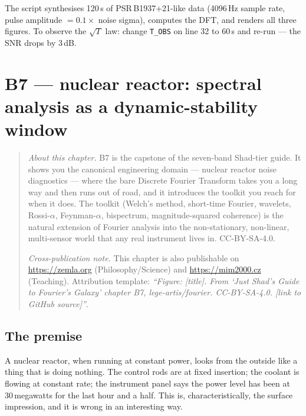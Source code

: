 \documentclass[11pt,a4paper,openany]{book}
\begin{document}
The script synthesises 120\,s of PSR\,B1937+21-like data (4096\,Hz sample
rate, pulse amplitude $= 0.1 \times$ noise sigma), computes the DFT, and
renders all three figures. To observe the $\sqrt{T}$ law: change
\texttt{T\_OBS} on line 32 to 60\,s and re-run --- the SNR drops by 3\,dB.

\chapter{B7 --- nuclear reactor: spectral analysis as a dynamic-stability window}
\label{ch:b7}

\begin{quote}
\textit{About this chapter.} B7 is the capstone of the seven-band Shad-tier
guide. It shows you the canonical engineering domain --- nuclear reactor noise
diagnostics --- where the bare Discrete Fourier Transform takes you a long way
and then runs out of road, and it introduces the toolkit you reach for when it
does. The toolkit (Welch's method, short-time Fourier, wavelets, Rossi-$\alpha$,
Feynman-$\alpha$, bispectrum, magnitude-squared coherence) is the natural
extension of Fourier analysis into the non-stationary, non-linear,
multi-sensor world that any real instrument lives in. CC-BY-SA-4.0.

\textit{Cross-publication note.} This chapter is also publishable on
\url{https://zemla.org} (Philosophy/Science) and \url{https://mim2000.cz}
(Teaching). Attribution template: \emph{``Figure: [title]. From `Just Shad's
Guide to Fourier's Galaxy' chapter B7, lege-artis/fourier. CC-BY-SA-4.0.
[link to GitHub source]''}.
\end{quote}

\section{The premise}

A nuclear reactor, when running at constant power, looks from the outside like
a thing that is doing nothing. The control rods are at fixed insertion; the
coolant is flowing at constant rate; the instrument panel says the power level
has been at 30\,megawatts for the last hour and a half. This is,
characteristically, the surface impression, and it is wrong in an interesting
way.
\end{document}

